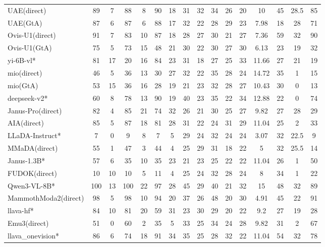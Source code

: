 \documentclass{article}
\theoremstyle{plain}
\theoremstyle{definition}
\theoremstyle{remark}
\begin{document}
\begin{table}[!htbp]
{\begin{tabular}{@{}lccccccccccccccc@{}}
UAE(direct) & 89 & 7 & 88 & 8 & 90 & 18 & 31 & 32 & 34 & 26 & 20 & 10 & 45 & 28.5 & 85 \\
UAE(GtA) & 87 & 6 & 87 & 6 & 88 & 17 & 32 & 22 & 28 & 29 & 23 & 7.98 & 18 & 28 & 71 \\
Ovis-U1(direct) & 91 & 7 & 83 & 10 & 87 & 18 & 28 & 27 & 30 & 21 & 27 & 7.36 & 59 & 32 & 90 \\
Ovis-U1(GtA) & 75 & 5 & 73 & 15 & 48 & 21 & 30 & 22 & 30 & 27 & 30 & 6.13 & 23 & 19 & 32 \\
\midrule
\rowcolor{gray!12}
yi-6B-vl* & 81 & 17 & 20 & 16 & 84 & 23 & 31 & 18 & 27 & 25 & 33 & 11.66 & 27 & 21 & 19 \\
mio(direct) & 46 & 5 & 36 & 13 & 30 & 27 & 32 & 22 & 35 & 28 & 24 & 14.72 & 35 & 1 & 15 \\
mio(GtA) & 53 & 15 & 36 & 16 & 28 & 19 & 21 & 23 & 32 & 28 & 27 & 10.43 & 30 & 0 & 13 \\
\midrule
\rowcolor{gray!12}
deepseek-v2* & 60 & 8 & 78 & 13 & 90 & 19 & 40 & 23 & 35 & 22 & 34 & 12.88 & 22 & 0 & 74 \\
Janus-Pro(direct) & 82 & 4 & 85 & 21 & 74 & 32 & 26 & 21 & 30 & 25 & 27 & 9.82 & 27 & 28 & 29 \\
AIA(direct) & 85 & 5 & 87 & 18 & 81 & 28 & 31 & 22 & 24 & 31 & 29 & 11.04 & 25 & 2 & 33 \\
\midrule
\rowcolor{gray!12}
LLaDA-Instruct* & 7 & 0 & 9 & 8 & 7 & 5 & 29 & 24 & 32 & 24 & 24 & 3.07 & 32 & 22.5 & 9 \\
MMaDA(direct) & 55 & 1 & 47 & 3 & 44 & 4 & 25 & 29 & 31 & 18 & 22 & 5 & 32 & 25.5 & 14 \\
\midrule
\rowcolor{gray!12}
Janus-1.3B* & 57 & 6 & 35 & 10 & 35 & 23 & 21 & 23 & 25 & 22 & 22 & 11.04 & 26 & 1 & 50 \\
FUDOK(direct) & 10 & 10 & 10 & 5 & 11 & 4 & 25 & 24 & 32 & 28 & 24 & 8 & 34 & 1 & 22 \\
\midrule
\rowcolor{gray!12}
Qwen3-VL-8B* & 100 & 13 & 100 & 22 & 97 & 28 & 45 & 29 & 40 & 21 & 32 & 15 & 48 & 32 & 89 \\
MammothModa2(direct) & 98 & 5 & 98 & 10 & 94 & 20 & 37 & 26 & 48 & 20 & 30 & 4.91 & 45 & 22 & 91 \\
\midrule
\rowcolor{gray!12}
llava-hf* & 84 & 10 & 81 & 20 & 59 & 31 & 23 & 30 & 29 & 20 & 22 & 9.2 & 27 & 19 & 28 \\
Emu3(direct) & 51 & 0 & 60 & 2 & 35 & 5 & 33 & 25 & 34 & 24 & 28 & 9.82 & 31 & 2 & 67 \\
\midrule
\rowcolor{gray!12}
llava\_onevision* & 86 & 6 & 74 & 18 & 91 & 34 & 35 & 25 & 28 & 32 & 22 & 11.04 & 54 & 32 & 78 \\

\end{tabular}}
\end{table}
\end{document}

